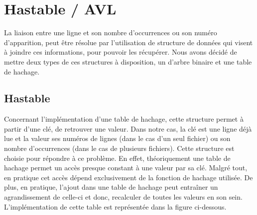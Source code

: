 \documentclass[12pt]{article}
\begin{document}
    \section{Hastable / AVL}

    La liaison entre une ligne et son nombre d'occurrences ou son numéro 
    d'apparition, peut être résolue par l'utilisation de structure de données 
    qui visent à joindre ces informations, pour pouvoir les récupérer. Nous 
    avons décidé de mettre deux types de ces structures à disposition, un 
    d'arbre binaire et une table de hachage. 

    \subsection{Hastable}

    Concernant l'implémentation d'une table de hachage, cette structure permet 
    à partir d'une clé, de retrouver une valeur. Dans notre cas, la clé est une ligne déjà 
    lue et la valeur ses numéros de lignes (dans le cas d'un seul fichier) ou 
    son nombre d'occurrences (dans le cas de plusieurs fichiers). Cette 
    structure est choisie pour répondre à ce problème. En effet, théoriquement 
    une table de hachage permet un accès presque constant à une valeur par sa 
    clé. Malgré tout, en pratique cet accès dépend exclusivement de la fonction 
    de hachage utilisée. De plus, en pratique, l'ajout dans une table de 
    hachage peut entraîner un agrandissement de celle-ci et donc, recalculer de 
    toutes les valeurs en son sein. L'implémentation de cette table est 
    représentée dans la figure ci-dessous. 
    
\end{document}
